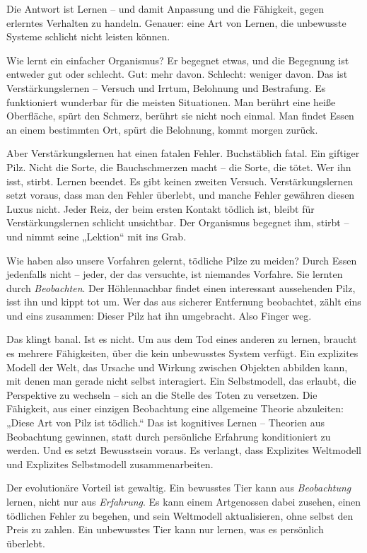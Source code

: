 \documentclass[11pt, twoside, openright]{book}
\begin{document}
Die Antwort ist Lernen -- und damit Anpassung und die Fähigkeit, gegen erlerntes Verhalten zu handeln. Genauer: eine Art von Lernen, die unbewusste Systeme schlicht nicht leisten können.

Wie lernt ein einfacher Organismus? Er begegnet etwas, und die Begegnung ist entweder gut oder schlecht. Gut: mehr davon. Schlecht: weniger davon. Das ist Verstärkungslernen -- Versuch und Irrtum, Belohnung und Bestrafung. Es funktioniert wunderbar für die meisten Situationen. Man berührt eine heiße Oberfläche, spürt den Schmerz, berührt sie nicht noch einmal. Man findet Essen an einem bestimmten Ort, spürt die Belohnung, kommt morgen zurück.

Aber Verstärkungslernen hat einen fatalen Fehler. Buchstäblich fatal.
Ein giftiger Pilz. Nicht die Sorte, die Bauchschmerzen macht -- die Sorte, die tötet. Wer ihn isst, stirbt. Lernen beendet. Es gibt keinen zweiten Versuch. Verstärkungslernen setzt voraus, dass man den Fehler überlebt, und manche Fehler gewähren diesen Luxus nicht. Jeder Reiz, der beim ersten Kontakt tödlich ist, bleibt für Verstärkungslernen schlicht unsichtbar. Der Organismus begegnet ihm, stirbt -- und nimmt seine „Lektion“ mit ins Grab.

Wie haben also unsere Vorfahren gelernt, tödliche Pilze zu meiden? Durch Essen jedenfalls nicht -- jeder, der das versuchte, ist niemandes Vorfahre. Sie lernten durch \textit{Beobachten}. Der Höhlennachbar findet einen interessant aussehenden Pilz, isst ihn und kippt tot um. Wer das aus sicherer Entfernung beobachtet, zählt eins und eins zusammen: Dieser Pilz hat ihn umgebracht. Also Finger weg.

Das klingt banal. Ist es nicht. Um aus dem Tod eines anderen zu lernen, braucht es mehrere Fähigkeiten, über die kein unbewusstes System verfügt. Ein explizites Modell der Welt, das Ursache und Wirkung zwischen Objekten abbilden kann, mit denen man gerade nicht selbst interagiert. Ein Selbstmodell, das erlaubt, die Perspektive zu wechseln -- sich an die Stelle des Toten zu versetzen. Die Fähigkeit, aus einer einzigen Beobachtung eine allgemeine Theorie abzuleiten: „Diese Art von Pilz ist tödlich.“ Das ist kognitives Lernen -- Theorien aus Beobachtung gewinnen, statt durch persönliche Erfahrung konditioniert zu werden. Und es setzt Bewusstsein voraus. Es verlangt, dass Explizites Weltmodell und Explizites Selbstmodell zusammenarbeiten.

Der evolutionäre Vorteil ist gewaltig. Ein bewusstes Tier kann aus \textit{Beobachtung} lernen, nicht nur aus \textit{Erfahrung}. Es kann einem Artgenossen dabei zusehen, einen tödlichen Fehler zu begehen, und sein Weltmodell aktualisieren, ohne selbst den Preis zu zahlen. Ein unbewusstes Tier kann nur lernen, was es persönlich überlebt.
\end{document}
